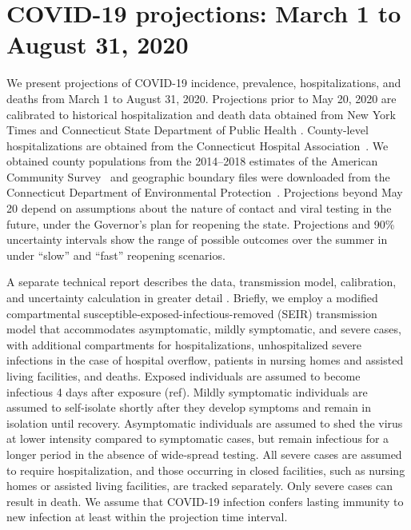 \documentclass[11pt]{article}
\begin{document}

\section*{COVID-19 projections: March 1 to August 31, 2020}

We present projections of COVID-19 incidence, prevalence, hospitalizations, and deaths from March 1 to August 31, 2020.  Projections prior to May 20, 2020 are calibrated to historical hospitalization and death data obtained from New York Times \citep{nyt2020Connecticut} and Connecticut State Department of Public Health \citep{DPHwebsite}.  County-level hospitalizations are obtained from the Connecticut Hospital Association~\citep{CHAwebsite}. We obtained county populations from the 2014--2018 estimates of the American Community Survey~\citep{acs2018} and geographic boundary files were downloaded from the Connecticut Department of Environmental Protection~\citep{shapefile}.  Projections beyond May 20 depend on assumptions about the nature of contact and viral testing in the future, under the Governor's plan for reopening the state.  Projections and 90\% uncertainty intervals show the range of possible outcomes over the summer in under ``slow'' and ``fast'' reopening scenarios.  

A separate technical report describes the data, transmission model, calibration, and uncertainty calculation in greater detail \citep{morozova2020tech}.  Briefly, we employ a modified compartmental susceptible-exposed-infectious-removed (SEIR) transmission model that accommodates asymptomatic, mildly symptomatic, and severe cases, with additional compartments for hospitalizations, unhospitalized severe infections in the case of hospital overflow, patients in nursing homes and assisted living facilities, and deaths. 
Exposed individuals are assumed to become infectious 4 days after exposure (ref). Mildly symptomatic individuals are assumed to self-isolate shortly after they develop symptoms and remain in isolation until recovery. Asymptomatic individuals are assumed to shed the virus at lower intensity compared to symptomatic cases, but remain infectious for a longer period in the absence of wide-spread testing. All severe cases are assumed to require hospitalization, and those occurring in closed facilities, such as nursing homes or assisted living facilities, are tracked separately. Only severe cases can result in death.  We assume that COVID-19 infection confers lasting immunity to new infection at least within the projection time interval.  
\end{document}
